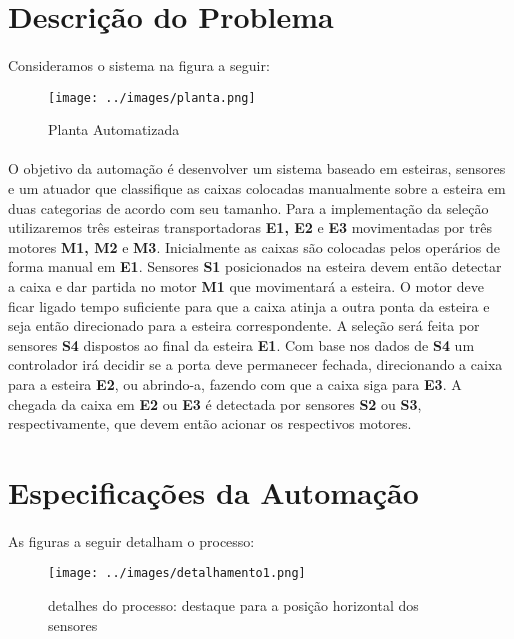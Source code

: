 \section{Descrição do Problema}
\paragraph{}Consideramos o sistema na figura a seguir:
\begin{figure}[H]
	\centering
	\texttt{[image: ../images/planta.png]}
	\caption{Planta Automatizada}
	\label{fig:planta}
\end{figure}
\paragraph{}
O objetivo da automação é desenvolver um sistema baseado em esteiras, sensores e um atuador que classifique as caixas colocadas manualmente sobre a esteira em duas categorias de acordo com seu tamanho.
Para a implementação da seleção utilizaremos três esteiras transportadoras \textbf{E1, E2} e  \textbf{E3} movimentadas por três motores \textbf{M1, M2} e  \textbf{M3}. Inicialmente as caixas são colocadas pelos operários de forma manual em\textbf{ E1}. Sensores \textbf{S1} posicionados na esteira devem
então detectar a caixa e dar partida no motor \textbf{M1} que movimentará a esteira. O motor deve ficar ligado tempo suficiente para que a caixa atinja
a outra ponta da esteira e seja então direcionado para a esteira correspondente. A seleção será feita por sensores \textbf{S4} dispostos ao final da esteira \textbf{E1}. Com base nos dados de \textbf{S4} um controlador irá decidir se a porta deve permanecer fechada, direcionando a caixa para a esteira \textbf{E2}, ou abrindo-a, fazendo com que a caixa siga para \textbf{E3}. A chegada da caixa  em \textbf{E2} ou \textbf{E3}
 é detectada por sensores\textbf{ S2 }ou \textbf{S3}, respectivamente, que devem então acionar os respectivos motores.

\section{Especificações da Automação}
\paragraph{}As figuras a seguir detalham o processo:
\begin{figure}[H]
	\centering
	\texttt{[image: ../images/detalhamento1.png]}
	\caption{detalhes do processo: destaque para a posição horizontal dos sensores}
	\label{fig:planta}
\end{figure}

